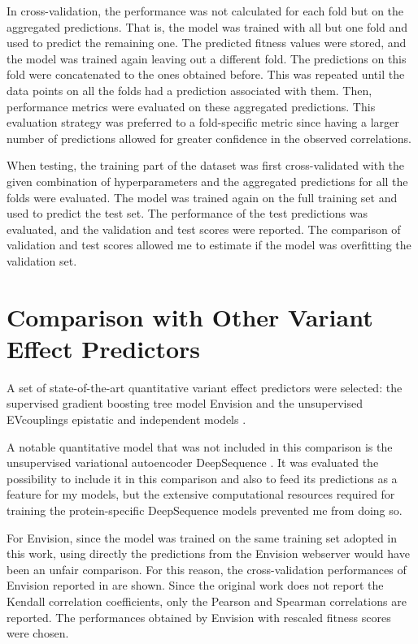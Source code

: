 In cross-validation, the performance was not calculated for each fold but on the aggregated predictions.
That is, the model was trained with all but one fold and used to predict the remaining one.
The predicted fitness values were stored, and the model was trained again leaving out a different fold.
The predictions on this fold were concatenated to the ones obtained before.
This was repeated until the data points on all the folds had a prediction associated with them.
Then, performance metrics were evaluated on these aggregated predictions.
This evaluation strategy was preferred to a fold-specific metric since having a larger number of predictions allowed for greater confidence in the observed correlations.

When testing, the training part of the dataset was first cross-validated with the given combination of hyperparameters and the aggregated predictions for all the folds were evaluated.
The model was trained again on the full training set and used to predict the test set.
The performance of the test predictions was evaluated, and the validation and test scores were reported.
The comparison of validation and test scores allowed me to estimate if the model was overfitting the validation set.

\section{Comparison with Other Variant Effect Predictors}
A set of state-of-the-art quantitative variant effect predictors were selected: the supervised gradient boosting tree model Envision \parencite{Gray2018} and the unsupervised EVcouplings epistatic and independent models \parencite{Hopf2018}.

A notable quantitative model that was not included in this comparison is the unsupervised variational autoencoder DeepSequence \parencite{Riesselman2018}.
It was evaluated the possibility to include it in this comparison and also to feed its predictions as a feature for my models, but the extensive computational resources required for training the protein-specific DeepSequence models prevented me from doing so.

For Envision, since the model was trained on the same training set adopted in this work, using directly the predictions from the Envision webserver would have been an unfair comparison.
For this reason, the cross-validation performances of Envision reported in \textcite{Gray2018} are shown.
Since the original work does not report the Kendall correlation coefficients, only the Pearson and Spearman correlations are reported.
The performances obtained by Envision with rescaled fitness scores were chosen.

